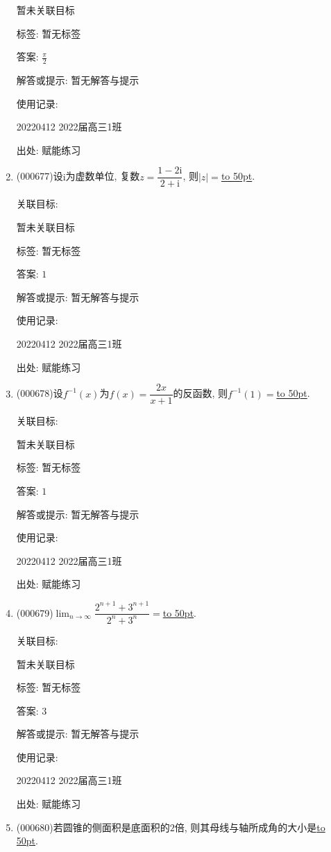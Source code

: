 \documentclass[10pt,a4paper]{article}
\newcommand{\blank}[1]{\underline{\hbox to #1pt{}}}
\begin{document}
\begin{enumerate}[1.]
暂未关联目标



标签: 暂无标签

答案: $\frac{\pi}2$

解答或提示: 暂无解答与提示

使用记录:

20220412	2022届高三1班	


出处: 赋能练习
\item { (000677)}设$\mathrm{i}$为虚数单位, 复数$z=\dfrac{1-2 \mathrm{i}}{2+\mathrm{i}}$, 则$|z|=$\blank{50}.


关联目标:

暂未关联目标



标签: 暂无标签

答案: $1$

解答或提示: 暂无解答与提示

使用记录:

20220412	2022届高三1班	


出处: 赋能练习
\item { (000678)}设$f^{-1}(x)$为$f(x)=\dfrac{2x}{x+1}$的反函数, 则$f^{-1}(1)=$\blank{50}.


关联目标:

暂未关联目标



标签: 暂无标签

答案: $1$

解答或提示: 暂无解答与提示

使用记录:

20220412	2022届高三1班	


出处: 赋能练习
\item { (000679)}$\displaystyle\lim_{n\to\infty}\dfrac{2^{n+1}+3^{n+1}}{2^n+3^n}=$\blank{50}.


关联目标:

暂未关联目标



标签: 暂无标签

答案: $3$

解答或提示: 暂无解答与提示

使用记录:

20220412	2022届高三1班	


出处: 赋能练习
\item { (000680)}若圆锥的侧面积是底面积的$2$倍, 则其母线与轴所成角的大小是\blank{50}.



\end{enumerate}
\end{document}

